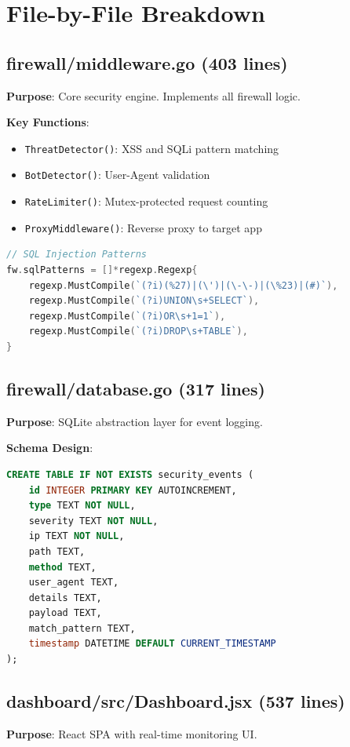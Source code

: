 \documentclass[11pt,a4paper]{report}
\begin{document}
\section{File-by-File Breakdown}

\subsection{firewall/middleware.go (403 lines)}
\textbf{Purpose}: Core security engine. Implements all firewall logic.

\textbf{Key Functions}:
\begin{itemize}
    \item \texttt{ThreatDetector()}: XSS and SQLi pattern matching
    \item \texttt{BotDetector()}: User-Agent validation
    \item \texttt{RateLimiter()}: Mutex-protected request counting
    \item \texttt{ProxyMiddleware()}: Reverse proxy to target app
\end{itemize}

\begin{lstlisting}[language=Go, caption=Regex Pattern Engine (Lines 52-61)]
// SQL Injection Patterns
fw.sqlPatterns = []*regexp.Regexp{
    regexp.MustCompile(`(?i)(%27)|(\')|(\-\-)|(\%23)|(#)`),
    regexp.MustCompile(`(?i)UNION\s+SELECT`),
    regexp.MustCompile(`(?i)OR\s+1=1`),
    regexp.MustCompile(`(?i)DROP\s+TABLE`),
}
\end{lstlisting}

\subsection{firewall/database.go (317 lines)}
\textbf{Purpose}: SQLite abstraction layer for event logging.

\textbf{Schema Design}:
\begin{lstlisting}[language=SQL,caption=Security Events Table (Lines 71-83)]
CREATE TABLE IF NOT EXISTS security_events (
    id INTEGER PRIMARY KEY AUTOINCREMENT,
    type TEXT NOT NULL,
    severity TEXT NOT NULL,
    ip TEXT NOT NULL,
    path TEXT,
    method TEXT,
    user_agent TEXT,
    details TEXT,
    payload TEXT,
    match_pattern TEXT,
    timestamp DATETIME DEFAULT CURRENT_TIMESTAMP
);
\end{lstlisting}

\subsection{dashboard/src/Dashboard.jsx (537 lines)}
\textbf{Purpose}: React SPA with real-time monitoring UI.
\end{document}
